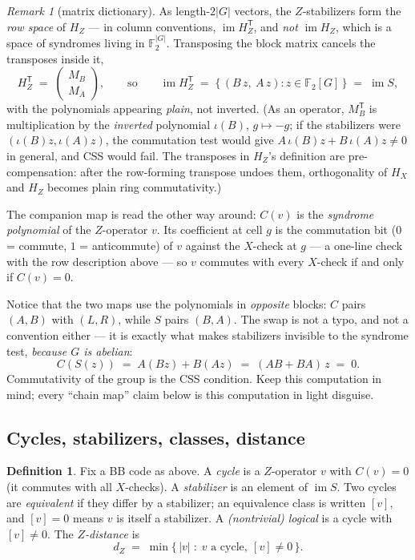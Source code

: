 \documentclass[11pt]{article}
\theoremstyle{plain}
\theoremstyle{definition}
\newtheorem{definition}[theorem]{Definition}
\theoremstyle{remark}
\newtheorem{remark}[theorem]{Remark}
\newcommand{\F}{\mathbb{F}}
\newcommand{\wt}[1]{\lvert #1\rvert}
\begin{document}
\begin{remark}[matrix dictionary]\label{rem:rowspace}
As length-$2|G|$ vectors, the $Z$-stabilizers form the \emph{row space} of
$H_Z$ --- in column conventions, $\operatorname{im} H_Z^{\mathsf T}$, and
\emph{not} $\operatorname{im} H_Z$, which is a space of syndromes living in
$\F_2^{|G|}$. Transposing the block matrix cancels the transposes inside it,
\[
H_Z^{\mathsf T} \;=\; \begin{pmatrix} M_B \\ M_A \end{pmatrix},
\qquad\text{so}\qquad
\operatorname{im} H_Z^{\mathsf T}
\;=\; \{\, (B\,z,\ A\,z) : z \in \F_2[G] \,\}
\;=\; \operatorname{im} S,
\]
with the polynomials appearing \emph{plain}, not inverted. (As an operator,
$M_B^{\mathsf T}$ is multiplication by the \emph{inverted} polynomial
$\iota(B)$, $g \mapsto -g$; if the stabilizers were $(\iota(B)z, \iota(A)z)$,
the commutation test would give $A\,\iota(B)z + B\,\iota(A)z \neq 0$ in
general, and CSS would fail. The transposes in $H_Z$'s definition are
pre-compensation: after the row-forming transpose undoes them, orthogonality
of $H_X$ and $H_Z$ becomes plain ring commutativity.)
\end{remark}

The companion map is read the other way around: $C(v)$ is the \emph{syndrome
polynomial} of the $Z$-operator $v$. Its coefficient at cell $g$ is the
commutation bit ($0$ = commute, $1$ = anticommute) of $v$ against the
$X$-check at $g$ --- a one-line check with the row description above --- so
$v$ commutes with every $X$-check if and only if $C(v) = 0$.

Notice that the two maps use the polynomials in \emph{opposite} blocks: $C$
pairs $(A, B)$ with $(L, R)$, while $S$ pairs $(B, A)$. The swap is not a
typo, and not a convention either --- it is exactly what makes stabilizers
invisible to the syndrome test, \emph{because $G$ is abelian}:
\[
C(S(z)) \;=\; A(Bz) + B(Az) \;=\; (AB + BA)\,z \;=\; 0 .
\]
Commutativity of the group is the CSS condition. Keep this computation in
mind; every ``chain map'' claim below is this computation in light disguise.

\subsection{Cycles, stabilizers, classes, distance}

\begin{definition}\label{def:cycles}
Fix a BB code as above. A \emph{cycle} is a $Z$-operator $v$ with $C(v) = 0$
(it commutes with all $X$-checks). A \emph{stabilizer} is an element of
$\operatorname{im} S$. Two cycles are \emph{equivalent} if they differ by a
stabilizer; an equivalence class is written $[v]$, and $[v] = 0$ means $v$ is
itself a stabilizer. A \emph{(nontrivial) logical} is a cycle with $[v] \neq
0$. The \emph{$Z$-distance} is
\[
d_Z \;=\; \min\{\, \wt{v} \;:\; v \text{ a cycle},\ [v] \neq 0 \,\}.
\]
\end{definition}
\end{document}
